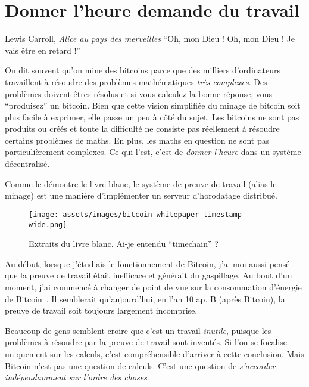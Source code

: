 \chapter{Donner l'heure demande du travail}
\label{les:17}

\begin{chapquote}{Lewis Carroll, \textit{Alice au pays des merveilles}}
\enquote{Oh, mon Dieu ! Oh, mon Dieu ! Je vais être en retard !}
\end{chapquote}

On dit souvent qu'on mine des bitcoins parce que des milliers d'ordinateurs
travaillent à résoudre des problèmes mathématiques \textit{très complexes}. Des
problèmes doivent êtres résolus et si vous calculez la bonne réponse, vous
\enquote{produisez} un bitcoin. Bien que cette vision simplifiée du minage de
bitcoin soit plus facile à exprimer, elle passe un peu à côté du sujet. Les
bitcoins ne sont pas produits ou créés et toute la difficulté ne consiste pas
réellement à résoudre certains problèmes de maths. En plus, les maths en
question ne sont pas particulièrement complexes. Ce qui l'est, c'est de
\textit{donner l'heure} dans un système décentralisé.

Comme le démontre le livre blanc, le système de preuve de travail (alias le
minage) est une manière d'implémenter un serveur d'horodatage distribué.

\begin{figure}
  \texttt{[image: assets/images/bitcoin-whitepaper-timestamp-wide.png]}
  \caption{Extraits du livre blanc. Ai-je entendu \enquote{timechain} ?}
  \label{fig:bitcoin-whitepaper-timestamp-wide}
\end{figure}

Au début, lorsque j'étudiais le fonctionnement de Bitcoin, j'ai moi aussi pensé
que la preuve de travail était inefficace et générait du gaspillage. Au bout
d'un moment, j'ai commencé à changer de point de vue sur la consommation
d'énergie de Bitcoin~\cite{gigi:energy}. Il semblerait qu'aujourd'hui, en l'an
10 ap. B (après Bitcoin), la preuve de travail soit toujours largement
incomprise.

Beaucoup de gens semblent croire que c'est un travail \textit{inutile}, puisque
les problèmes à résoudre par la preuve de travail sont inventés. Si l'on se
focalise uniquement sur les calculs, c'est compréhensible d'arriver à cette
conclusion. Mais Bitcoin n'est pas une question de calculs. C'est une question
de \textit{s'accorder indépendamment sur l'ordre des choses}.

